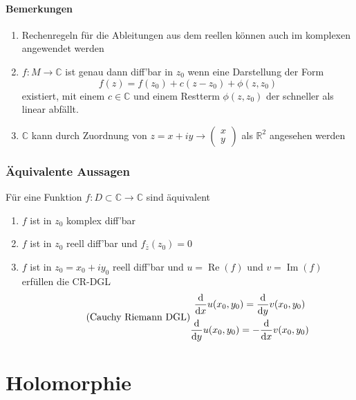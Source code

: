 \paragraph{Bemerkungen}
\begin{enumerate}
    \item Rechenregeln für die Ableitungen aus dem reellen können auch im komplexen angewendet werden
    \item $f:M\to\mathbb{C}$ ist genau dann diff'bar in $z_0$ wenn eine Darstellung der Form 
            \begin{equation*}
                f(z)=f(z_0)+c(z-z_0)+\phi(z,z_0)
            \end{equation*}
            existiert, mit einem $c\in\mathbb{C}$ und einem Restterm $\phi(z,z_0)$ der schneller als linear abfällt.
    \item $\mathbb{C}$ kann durch Zuordnung von $z=x+iy\to \left(\begin{smallmatrix}x \\ y\end{smallmatrix}\right)$ als $\mathbb{R}^2$ angesehen werden        
\end{enumerate}

\subsubsection{Äquivalente Aussagen}
Für eine Funktion $f:D\subset\mathbb{C}\to\mathbb{C}$ sind äquivalent
\begin{enumerate}
    \item $f$ ist in $z_0$ komplex diff'bar
    \item $f$ ist in $z_0$ reell diff'bar und $f_{\bar{z}}(z_0)=0$
    \item $f$ ist in $z_0=x_0+iy_0$ reell diff'bar und $u=\operatorname{Re}(f)$ und $v=\operatorname{Im}(f)$ erfüllen die CR-DGL
    \begin{equation}
        \tag{Cauchy Riemann DGL}
        \label{eq:cr-dgl}
        \begin{gathered}
                \frac{\diff}{\diff x}u(x_0,y_0) = \frac{\diff}{\diff y}v(x_0,y_0)\\
                \frac{\diff}{\diff y}u(x_0,y_0) = - \frac{\diff}{\diff x}v(x_0,y_0)
        \end{gathered}
    \end{equation}
            
\end{enumerate}

\section{Holomorphie}
